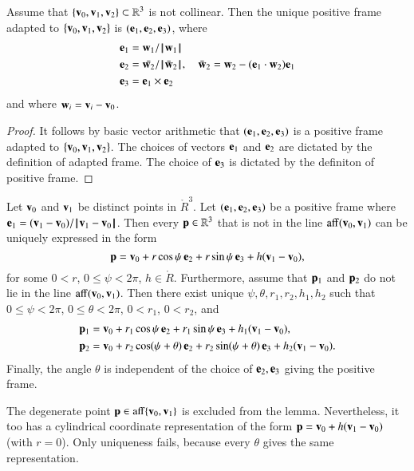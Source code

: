 \begin{lemma}[orthonormalization]
\label{lemma:frame}
  Assume that $\{{\mathbf v}_0,{\mathbf v}_1,{\mathbf v}_2\}\subset\mathbb{R}^3$ is not collinear.
  Then the unique positive frame adapted to 
  $\{{\mathbf v}_0,{\mathbf v}_1,{\mathbf v}_2\}$ is $({\mathbf e}_1,{\mathbf e}_2,{\mathbf e}_3)$, where
\begin{align*}
{\mathbf e}_1 &= {\mathbf w}_1/{{\hskip0.1em|\hskip-0.15em|\hskip0.1em}{\mathbf w}_1{\hskip0.1em|\hskip-0.15em|\hskip0.1em}}\\
{\mathbf e}_2 &= \bar{{\mathbf w}_2}/{{\hskip0.1em|\hskip-0.15em|\hskip0.1em}\bar{{\mathbf w}}_2{\hskip0.1em|\hskip-0.15em|\hskip0.1em}},\quad \bar{{\mathbf w}}_2 = {\mathbf w}_2 - ({\mathbf e}_1\cdot {\mathbf w}_2) {\mathbf e}_1\\
{\mathbf e}_3 &= {\mathbf e}_1 \times {\mathbf e}_2 
\end{align*}
and where ${\mathbf w}_i = {\mathbf v}_i - {\mathbf v}_0$.
\end{lemma}

\begin{proof} It follows by basic vector arithmetic that
  $({\mathbf e}_1,{\mathbf e}_2,{\mathbf e}_3)$ is a positive frame adapted to
  $\{{\mathbf v}_0,{\mathbf v}_1,{\mathbf v}_2\}$.  The choices of vectors ${\mathbf e}_1$ and ${\mathbf e}_2$ are
  dictated by the definition of adapted frame.  The choice of ${\mathbf e}_3$
  is dictated by the definiton of positive frame.
\end{proof}

\begin{lemma}
Let ${\mathbf v}_0$ and ${\mathbf v}_1$ be distinct points in 
$\ring{R}^3$.  Let $({\mathbf e}_1,{\mathbf e}_2,{\mathbf e}_3)$ be a positive frame 
where $\e_1 = (\v_1-\v_0)/\norm{\v_1}{\v_0}$.
Then every
${\mathbf p}\in\mathbb{R}^3$ that is not in the line ${\operatorname{aff}}({\mathbf v}_0,{\mathbf v}_1)$
can be uniquely expressed in the form
\begin{displaymath}
{\mathbf p} = {\mathbf v}_0 + r\cos\psi\, {\mathbf e}_2 + r\sin\psi\, {\mathbf e}_3 + h ({\mathbf v}_1-{\mathbf v}_0),
\end{displaymath}
%
%
for some $0< r$, $0\le \psi < 2\pi$, $h\in\ring{R}$.
Furthermore,
assume that ${\mathbf p}_1$ and ${\mathbf p}_2$ do
not lie in the line ${\operatorname{aff}}({\mathbf v}_0,{\mathbf v}_1)$.
Then there exist unique $\psi,\theta,r_1,r_2,h_1,h_2$
such
that $0\le\psi<2\pi$, $0\le\theta < 2\pi$, $0 < r_1$, $0 < r_2$, and
\begin{align*}
{\mathbf p}_1 &= {\mathbf v}_0 + r_1\cos\psi\, {\mathbf e}_2 + r_1\sin\psi\, {\mathbf e}_3 + h_1({\mathbf v}_1-{\mathbf v}_0),\\
{\mathbf p}_2 &= {\mathbf v}_0 + r_2\cos(\psi+\theta)\, {\mathbf e}_2 + r_2\sin(\psi+\theta)\, {\mathbf e}_3 
+ h_2({\mathbf v}_1-{\mathbf v}_0).
\end{align*}
Finally, the angle $\theta$ is independent of the choice of ${\mathbf e}_2,{\mathbf e}_3$
giving the positive frame.
\end{lemma}
%
%
%
%
%
%
%
The degenerate point ${\mathbf p}\in{\operatorname{aff}}\{{\mathbf v}_0,{\mathbf v}_1\}$ is excluded from the
lemma.  Nevertheless, it too has a cylindrical coordinate
representation of the form ${\mathbf p} = {\mathbf v}_0 + h({\mathbf v}_1-{\mathbf v}_0)$ (with $r=0$).
Only uniqueness fails, because every $\theta$ gives the same
representation.

